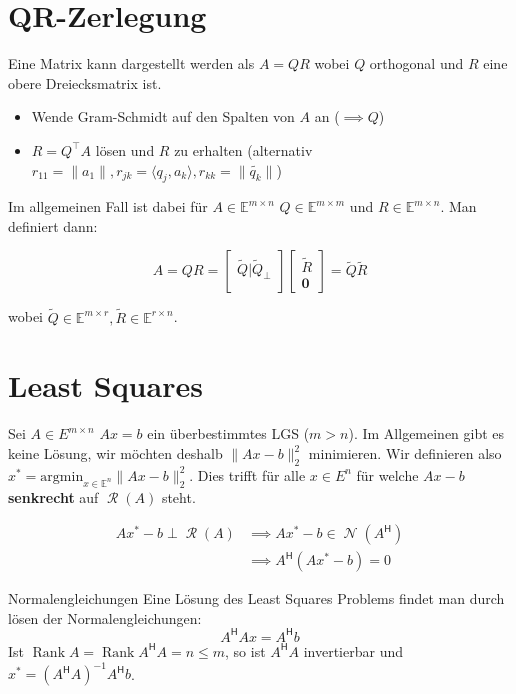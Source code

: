 \documentclass[a4paper,10pt]{article}
\DeclareMathOperator{\Rank}{Rank}
\DeclareMathOperator{\Columnspace}{\mathcal{R}}
\DeclareMathOperator{\Nullspace}{\mathcal{N}}
\newcommand*{\hermconj}{\mathsf{H}}
\def\E{\mathbb{E}}
\begin{document}
\section{QR-Zerlegung}

Eine Matrix kann dargestellt werden als $A = QR$ wobei $Q$ orthogonal und $R$ eine obere Dreiecksmatrix ist.

\begin{itemize}
  \item Wende Gram-Schmidt auf den Spalten von $A$ an ($\implies Q$)
  \item $R = Q^\top A$ lösen und $R$ zu erhalten (alternativ $r_{11} = \lVert a_1 \rVert, r_{jk} = \langle q_j, a_k \rangle, r_{kk} = \lVert \widetilde{q_k} \rVert$)
\end{itemize}

Im allgemeinen Fall ist dabei für $A \in \E^{m \times n}$ $Q \in \E^{m \times m}$ und $R \in \E^{m \times n}$. Man definiert dann:

$$A = QR = \begin{bmatrix}
  \widetilde{Q} | \widetilde{Q}_\perp\\
\end{bmatrix} \begin{bmatrix}
  \widetilde{R}\\
  \hline
  \mathbf{0}
\end{bmatrix} = \widetilde{Q} \widetilde{R}$$

wobei $\widetilde{Q} \in \E^{m \times r}, \widetilde{R} \in \E^{r \times n}$.

\section{Least Squares}

Sei $A \in E^{m \times n}$ $Ax = b$ ein überbestimmtes LGS ($m > n$). Im Allgemeinen gibt es keine Lösung, wir möchten deshalb $\lVert Ax - b \rVert_2^2$ minimieren. Wir definieren also $x^\ast = \text{argmin}_{x \in \E^n} \lVert Ax - b \rVert_2^2$. Dies trifft für alle $x \in E^n$ für welche $Ax - b$ \textbf{senkrecht} auf $\Columnspace(A)$ steht. 

\begin{align*}
  Ax^\ast - b \perp \Columnspace(A) & \implies Ax^\ast - b \in \Nullspace(A^\hermconj)\\
  & \implies A^\hermconj(Ax^\ast - b) = 0
\end{align*}

\begin{subbox}{Normalengleichungen}
  Eine Lösung des Least Squares Problems findet man durch lösen der Normalengleichungen:
  $$A^\hermconj A x = A^\hermconj b$$
  Ist $\Rank A = \Rank A^\hermconj A = n \leq m$, so ist $A^\hermconj A$ invertierbar und $x^\ast = (A^\hermconj A)^{-1} A^\hermconj b$.
\end{subbox}
\end{document}
